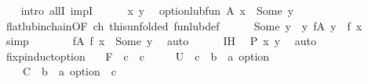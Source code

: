 \begin{isabellebody}
\ \ \isamarkupfalse%
\ {\isacharparenleft}{\kern0pt}intro\ allI\ impI{\isacharparenright}{\kern0pt}\isanewline
\ \ \ \ \isamarkupfalse%
\ x\ y\ \isamarkupfalse%
\ {\isachardoublequoteopen}option{\isachardot}{\kern0pt}lub{\isacharunderscore}{\kern0pt}fun\ A\ x\ {\isacharequal}{\kern0pt}\ Some\ y{\isachardoublequoteclose}\isanewline
\ \ \ \ \isamarkupfalse%
\ flat{\isacharunderscore}{\kern0pt}lub{\isacharunderscore}{\kern0pt}in{\isacharunderscore}{\kern0pt}chain{\isacharbrackleft}{\kern0pt}OF\ ch{\isacharprime}{\kern0pt}\ this{\isacharbrackleft}{\kern0pt}unfolded\ fun{\isacharunderscore}{\kern0pt}lub{\isacharunderscore}{\kern0pt}def{\isacharbrackright}{\kern0pt}{\isacharbrackright}{\kern0pt}\isanewline
\ \ \ \ \isamarkupfalse%
\ {\isachardoublequoteopen}Some\ y\ {\isasymin}\ {\isacharbraceleft}{\kern0pt}y{\isachardot}{\kern0pt}\ {\isasymexists}f{\isasymin}A{\isachardot}{\kern0pt}\ y\ {\isacharequal}{\kern0pt}\ f\ x{\isacharbraceright}{\kern0pt}{\isachardoublequoteclose}\ \isamarkupfalse%
\ simp\isanewline
\ \ \ \ \isamarkupfalse%
\ \isamarkupfalse%
\ {\isachardoublequoteopen}{\isasymexists}f{\isasymin}A{\isachardot}{\kern0pt}\ f\ x\ {\isacharequal}{\kern0pt}\ Some\ y{\isachardoublequoteclose}\ \isamarkupfalse%
\ auto\isanewline
\ \ \ \ \isamarkupfalse%
\ IH\ \isamarkupfalse%
\ {\isachardoublequoteopen}P\ x\ y{\isachardoublequoteclose}\ \isamarkupfalse%
\ auto\isanewline
\ \ \isamarkupfalse%
\isanewline
{}\isamarkupfalse%
%
\endisatagproof
{\isafoldproof}%
%
\isadelimproof
\isanewline
%
\endisadelimproof
\isanewline
{}\isamarkupfalse%
\ fixp{\isacharunderscore}{\kern0pt}induct{\isacharunderscore}{\kern0pt}option{\isacharcolon}{\kern0pt}\isanewline
\ \ \ F\ {\isacharcolon}{\kern0pt}{\isacharcolon}{\kern0pt}\ {\isachardoublequoteopen}{\isacharprime}{\kern0pt}c\ {\isasymRightarrow}\ {\isacharprime}{\kern0pt}c{\isachardoublequoteclose}\ \isanewline
\ \ \ \ U\ {\isacharcolon}{\kern0pt}{\isacharcolon}{\kern0pt}\ {\isachardoublequoteopen}{\isacharprime}{\kern0pt}c\ {\isasymRightarrow}\ {\isacharprime}{\kern0pt}b\ {\isasymRightarrow}\ {\isacharprime}{\kern0pt}a\ option{\isachardoublequoteclose}\ \isanewline
\ \ \ \ C\ {\isacharcolon}{\kern0pt}{\isacharcolon}{\kern0pt}\ {\isachardoublequoteopen}{\isacharparenleft}{\kern0pt}{\isacharprime}{\kern0pt}b\ {\isasymRightarrow}\ {\isacharprime}{\kern0pt}a\ option{\isacharparenright}{\kern0pt}\ {\isasymRightarrow}\ {\isacharprime}{\kern0pt}c{\isachardoublequoteclose}\ \isanewline

\end{isabellebody}
